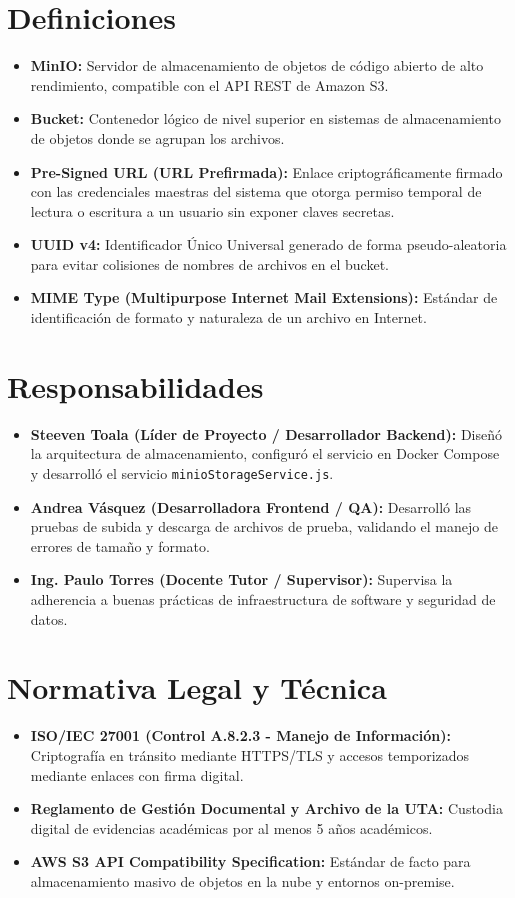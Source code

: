 \documentclass[12pt,a4paper]{article}
\begin{document}
\section{Definiciones}
\begin{itemize}[leftmargin=1.5em, itemsep=1.5pt]
    \item \textbf{MinIO:} Servidor de almacenamiento de objetos de código abierto de alto rendimiento, compatible con el API REST de Amazon S3.
    \item \textbf{Bucket:} Contenedor lógico de nivel superior en sistemas de almacenamiento de objetos donde se agrupan los archivos.
    \item \textbf{Pre-Signed URL (URL Prefirmada):} Enlace criptográficamente firmado con las credenciales maestras del sistema que otorga permiso temporal de lectura o escritura a un usuario sin exponer claves secretas.
    \item \textbf{UUID v4:} Identificador Único Universal generado de forma pseudo-aleatoria para evitar colisiones de nombres de archivos en el bucket.
    \item \textbf{MIME Type (Multipurpose Internet Mail Extensions):} Estándar de identificación de formato y naturaleza de un archivo en Internet.
\end{itemize}

\section{Responsabilidades}
\begin{itemize}[leftmargin=1.5em, itemsep=2pt]
    \item \textbf{Steeven Toala (Líder de Proyecto / Desarrollador Backend):} Diseñó la arquitectura de almacenamiento, configuró el servicio en Docker Compose y desarrolló el servicio \texttt{minioStorageService.js}.
    \item \textbf{Andrea Vásquez (Desarrolladora Frontend / QA):} Desarrolló las pruebas de subida y descarga de archivos de prueba, validando el manejo de errores de tamaño y formato.
    \item \textbf{Ing. Paulo Torres (Docente Tutor / Supervisor):} Supervisa la adherencia a buenas prácticas de infraestructura de software y seguridad de datos.
\end{itemize}

\section{Normativa Legal y Técnica}
\begin{itemize}[leftmargin=1.5em, itemsep=1.5pt]
    \item \textbf{ISO/IEC 27001 (Control A.8.2.3 - Manejo de Información):} Criptografía en tránsito mediante HTTPS/TLS y accesos temporizados mediante enlaces con firma digital.
    \item \textbf{Reglamento de Gestión Documental y Archivo de la UTA:} Custodia digital de evidencias académicas por al menos 5 años académicos.
    \item \textbf{AWS S3 API Compatibility Specification:} Estándar de facto para almacenamiento masivo de objetos en la nube y entornos on-premise.
\end{itemize}
\end{document}
